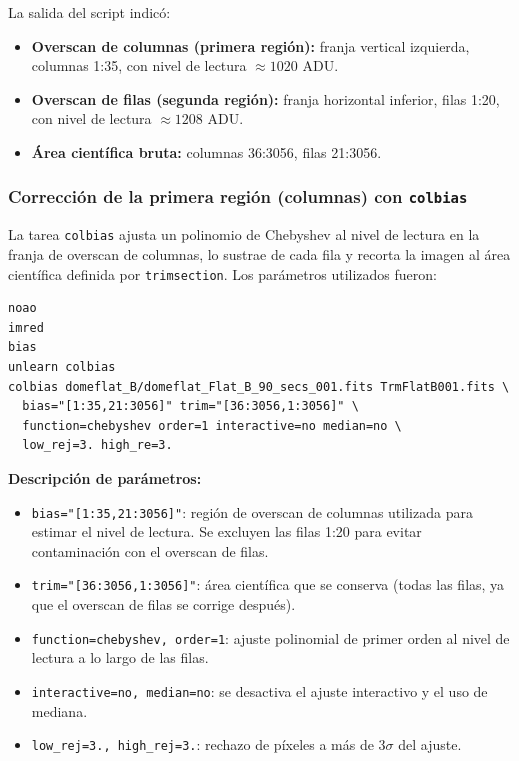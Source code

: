 \documentclass[10pt,a4paper,twocolumn]{article}
\begin{document}
\noindent La salida del script indicó:

\begin{itemize}
\item \textbf{Overscan de columnas (primera región):} franja vertical
izquierda, columnas 1:35, con nivel de lectura $\approx 1020$ ADU.
\item \textbf{Overscan de filas (segunda región):} franja horizontal
inferior, filas 1:20, con nivel de lectura $\approx 1208$ ADU.
\item \textbf{Área científica bruta:} columnas 36:3056, filas 21:3056.
\end{itemize}

\subsubsection{Corrección de la primera región (columnas) con \texttt{colbias}}

La tarea \texttt{colbias} ajusta un polinomio de Chebyshev al nivel de
lectura en la franja de overscan de columnas, lo sustrae de cada fila y
recorta la imagen al área científica definida por \texttt{trimsection}.
Los parámetros utilizados fueron:

\begin{lstlisting}
noao
imred
bias
unlearn colbias
colbias domeflat_B/domeflat_Flat_B_90_secs_001.fits TrmFlatB001.fits \
  bias="[1:35,21:3056]" trim="[36:3056,1:3056]" \
  function=chebyshev order=1 interactive=no median=no \
  low_rej=3. high_re=3.
\end{lstlisting}

\noindent\textbf{Descripción de parámetros:}
\begin{itemize}
\item \texttt{bias="[1:35,21:3056]"}: región de overscan de columnas
utilizada para estimar el nivel de lectura. Se excluyen las filas 1:20
para evitar contaminación con el overscan de filas.
\item \texttt{trim="[36:3056,1:3056]"}: área científica que se conserva
(todas las filas, ya que el overscan de filas se corrige después).
\item \texttt{function=chebyshev, order=1}: ajuste polinomial de primer
orden al nivel de lectura a lo largo de las filas.
\item \texttt{interactive=no, median=no}: se desactiva el ajuste
interactivo y el uso de mediana.
\item \texttt{low\_rej=3., high\_rej=3.}: rechazo de píxeles a más de
3$\sigma$ del ajuste.
\end{itemize}
\end{document}
